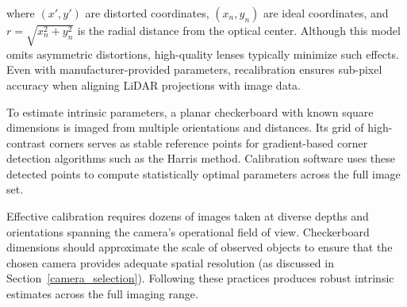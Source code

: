 \documentclass{erauthesis}
\begin{document}
where $(x', y')$ are distorted coordinates, $(x_n, y_n)$ are ideal coordinates, and $r = \sqrt{x_n^2 + y_n^2}$ is the radial distance from the optical center.  
Although this model omits asymmetric distortions, high-quality lenses typically minimize such effects.  
Even with manufacturer-provided parameters, recalibration ensures sub-pixel accuracy when aligning \ac{LiDAR} projections with image data.

To estimate intrinsic parameters, a planar checkerboard with known square dimensions is imaged from multiple orientations and distances.  
Its grid of high-contrast corners serves as stable reference points for gradient-based corner detection algorithms such as the Harris method.  
Calibration software uses these detected points to compute statistically optimal parameters across the full image set.

Effective calibration requires dozens of images taken at diverse depths and orientations spanning the camera’s operational field of view.  
Checkerboard dimensions should approximate the scale of observed objects to ensure that the chosen camera provides adequate spatial resolution (as discussed in Section~\ref{camera_selection}).  
Following these practices produces robust intrinsic estimates across the full imaging range.
\end{document}
